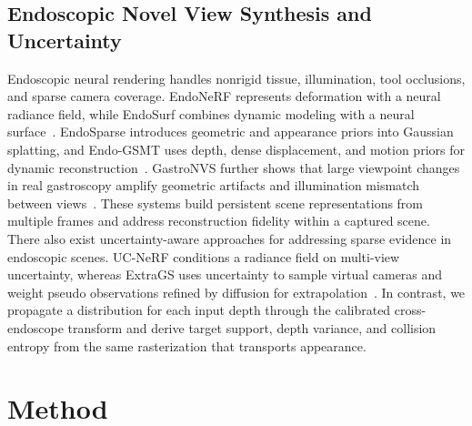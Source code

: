 \documentclass[letterpaper,10pt,conference]{ieeeconf}
\begin{document}
\subsection{Endoscopic Novel View Synthesis and Uncertainty}

Endoscopic neural rendering handles nonrigid tissue, illumination, tool occlusions, and sparse camera coverage. EndoNeRF represents
deformation with a neural radiance field, while EndoSurf combines dynamic
modeling with a neural surface~\cite{wang2022endonerf,zha2023endosurf}.
EndoSparse introduces geometric and appearance priors into Gaussian splatting,
and Endo-GSMT uses depth, dense displacement, and motion priors for dynamic
reconstruction~\cite{li2024endosparse,gou2025endogsmt}. GastroNVS further shows
that large viewpoint changes in real gastroscopy amplify geometric artifacts
and illumination mismatch between views~\cite{minai2026gastronvs}. These systems
build persistent scene representations from multiple frames and address
reconstruction fidelity within a captured scene. 
There also exist uncertainty-aware approaches for addressing sparse evidence in endoscopic scenes.
UC-NeRF conditions a
radiance field on multi-view uncertainty, whereas ExtraGS uses uncertainty to
sample virtual cameras and weight pseudo observations refined by diffusion for
extrapolation~\cite{guo2025ucnerf,hsieh2026extrags}.
In contrast, we propagate a distribution for each input depth through the
calibrated cross-endoscope transform and derive target support, depth variance,
and collision entropy from the same rasterization that transports appearance.




\section{Method}
\label{sec:method}

\end{document}
